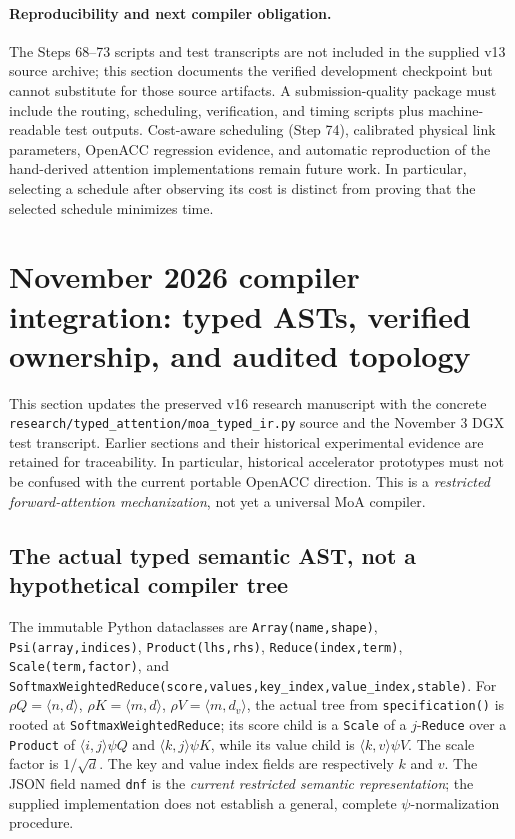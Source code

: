 \documentclass[11pt]{article}
\begin{document}
\paragraph{Reproducibility and next compiler obligation.}
The Steps 68--73 scripts and test transcripts are not included in the supplied v13 source archive; this section documents the verified development checkpoint but cannot substitute for those source artifacts. A submission-quality package must include the routing, scheduling, verification, and timing scripts plus machine-readable test outputs. Cost-aware scheduling (Step 74), calibrated physical link parameters, OpenACC regression evidence, and automatic reproduction of the hand-derived attention implementations remain future work. In particular, selecting a schedule after observing its cost is distinct from proving that the selected schedule minimizes time.


\clearpage
\section{November 2026 compiler integration: typed ASTs, verified ownership, and audited topology}
\label{sec:november-integration}
This section updates the preserved v16 research manuscript with the concrete
\texttt{research/typed\_attention/moa\_typed\_ir.py} source and the November 3
DGX test transcript. Earlier sections and their historical experimental evidence
are retained for traceability. In particular, historical accelerator prototypes
must not be confused with the current portable OpenACC direction. This is a
\emph{restricted forward-attention mechanization}, not yet a universal MoA compiler.

\subsection{The actual typed semantic AST, not a hypothetical compiler tree}
The immutable Python dataclasses are
\texttt{Array(name,shape)}, \texttt{Psi(array,indices)},
\texttt{Product(lhs,rhs)}, \texttt{Reduce(index,term)},
\texttt{Scale(term,factor)}, and
\texttt{SoftmaxWeightedReduce(score,values,key\_index,value\_index,stable)}.
For $\rho Q=\langle n,d\rangle$, $\rho K=\langle m,d\rangle$,
$\rho V=\langle m,d_v\rangle$, the actual tree from
\texttt{specification()} is rooted at \texttt{SoftmaxWeightedReduce};
its score child is a \texttt{Scale} of a $j$-\texttt{Reduce} over a
\texttt{Product} of $\langle i,j\rangle\psi Q$ and
$\langle k,j\rangle\psi K$, while its value child is
$\langle k,v\rangle\psi V$. The scale factor is $1/\sqrt d$.
The key and value index fields are respectively $k$ and $v$.
The JSON field named \texttt{dnf} is the \emph{current restricted
semantic representation}; the supplied implementation does not establish a
general, complete $\psi$-normalization procedure.
\end{document}
